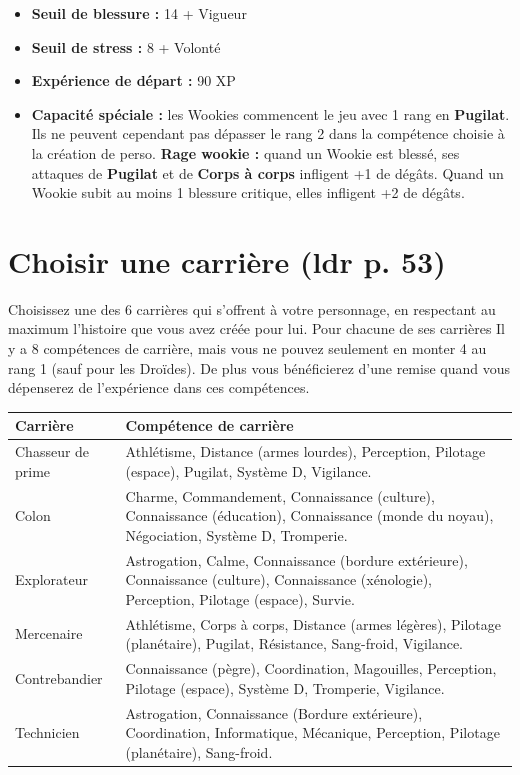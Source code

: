 \documentclass[twoside]{article}
\begin{document}
\hfill%
\begin{minipage}{0.7\textwidth}\raggedleft
	\begin{itemize}
		\item \textbf{Seuil de blessure :} 14 + Vigueur 
		\item \textbf{Seuil de stress :} 8 + Volonté 
		\item \textbf{Expérience de départ :} 90 XP
		\item \textbf{Capacité spéciale :} les Wookies commencent le jeu avec 1 rang en \textbf{Pugilat}. Ils ne peuvent cependant pas dépasser le rang 2 dans la compétence choisie à la création de perso.	\textbf{Rage wookie :} quand un Wookie est blessé, ses attaques de \textbf{Pugilat} et de \textbf{Corps à corps} infligent +1 de dégâts. Quand un Wookie subit au moins 1 blessure critique, elles infligent +2 de dégâts.
	\end{itemize}
\end{minipage}
\clearpage

\section{Choisir une carrière (ldr p. 53)}
Choisissez une des 6 carrières qui s'offrent à votre personnage, en respectant au maximum l'histoire que vous avez créée pour lui. Pour chacune de ses carrières Il y a 8 compétences de carrière, mais vous ne pouvez seulement en monter 4 au rang 1 (sauf pour les Droïdes). De plus vous bénéficierez d'une remise quand vous dépenserez de l'expérience dans ces compétences.

\begin{table}[h]
	 \centering
	\begin{tabular}{|m{3.5cm}|m{12cm}|}
		\hline
		\cellcolor{DarkRed} {\large \textcolor{PureWhite}{\textbf{Carrière}}} & \cellcolor{DarkRed} {\large \textcolor{PureWhite}{\textbf{Compétence de carrière}}} \\
		\hline
		Chasseur de prime & Athlétisme, Distance (armes lourdes), Perception, Pilotage (espace), Pugilat, Système D, Vigilance. \\
		\hline
		Colon & Charme, Commandement, Connaissance (culture), Connaissance (éducation), Connaissance (monde du noyau), Négociation, Système D, Tromperie. \\
		\hline
		Explorateur & Astrogation, Calme, Connaissance (bordure extérieure), Connaissance (culture), Connaissance (xénologie), Perception, Pilotage (espace), Survie. \\
		\hline
		Mercenaire & Athlétisme, Corps à corps, Distance (armes légères), Pilotage (planétaire), Pugilat, Résistance, Sang-froid, Vigilance. \\
		\hline
		Contrebandier & Connaissance (pègre), Coordination, Magouilles, Perception, Pilotage (espace), Système D, Tromperie, Vigilance. \\
		\hline
		Technicien & Astrogation, Connaissance (Bordure extérieure), Coordination, Informatique, Mécanique, Perception, Pilotage (planétaire), Sang-froid. \\
		\hline
	\end{tabular}
\end{table}
\clearpage
\end{document}
